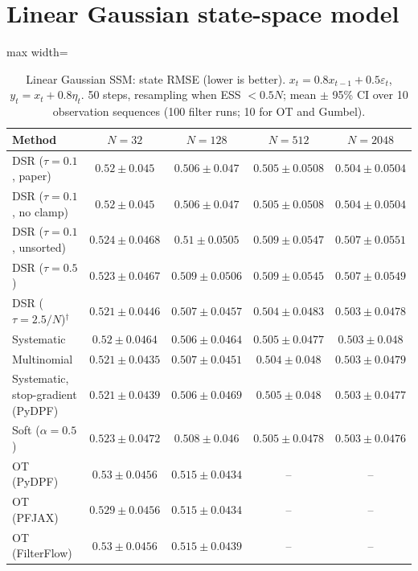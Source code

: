 \clearpage
\section*{Linear Gaussian state-space model}

\begin{table}[H]
\centering
\small
\caption{Linear Gaussian SSM: state RMSE (lower is better). $x_t=0.8x_{t-1}+0.5\varepsilon_t$, $y_t=x_t+0.8\eta_t$. 50 steps, resampling when ESS $<0.5N$; mean $\pm$ 95\% CI over 10 observation sequences (100 filter runs; 10 for OT and Gumbel).}
\label{tab:linear-rmse}
\begin{adjustbox}{max width=\linewidth}
\begin{tabular}{lcccc}
\toprule
Method & $N{=}32$ & $N{=}128$ & $N{=}512$ & $N{=}2048$ \\
\midrule
DSR ($\tau{=}0.1$, paper) & $0.52\pm0.045$ & $0.506\pm0.047$ & $0.505\pm0.0508$ & $0.504\pm0.0504$ \\
DSR ($\tau{=}0.1$, no clamp) & $0.52\pm0.045$ & $0.506\pm0.047$ & $0.505\pm0.0508$ & $0.504\pm0.0504$ \\
DSR ($\tau{=}0.1$, unsorted) & $0.524\pm0.0468$ & $0.51\pm0.0505$ & $0.509\pm0.0547$ & $0.507\pm0.0551$ \\
DSR ($\tau{=}0.5$) & $0.523\pm0.0467$ & $0.509\pm0.0506$ & $0.509\pm0.0545$ & $0.507\pm0.0549$ \\
DSR ($\tau{=}2.5/N$)$^\dagger$ & $0.521\pm0.0446$ & $0.507\pm0.0457$ & $0.504\pm0.0483$ & $0.503\pm0.0478$ \\
\midrule
Systematic & $0.52\pm0.0464$ & $\mathbf{0.506\pm0.0464}$ & $0.505\pm0.0477$ & $0.503\pm0.048$ \\
Multinomial & $0.521\pm0.0435$ & $0.507\pm0.0451$ & $0.504\pm0.048$ & $0.503\pm0.0479$ \\
Systematic, stop-gradient (PyDPF) & $0.521\pm0.0439$ & $0.506\pm0.0469$ & $0.505\pm0.048$ & $0.503\pm0.0477$ \\
Soft ($\alpha{=}0.5$) & $0.523\pm0.0472$ & $0.508\pm0.046$ & $0.505\pm0.0478$ & $\mathbf{0.503\pm0.0476}$ \\
OT (PyDPF) & $0.53\pm0.0456$ & $0.515\pm0.0434$ & -- & -- \\
OT (PFJAX) & $0.529\pm0.0456$ & $0.515\pm0.0434$ & -- & -- \\
OT (FilterFlow) & $0.53\pm0.0456$ & $0.515\pm0.0439$ & -- & -- \\

\end{tabular}
\end{adjustbox}
\end{table}
